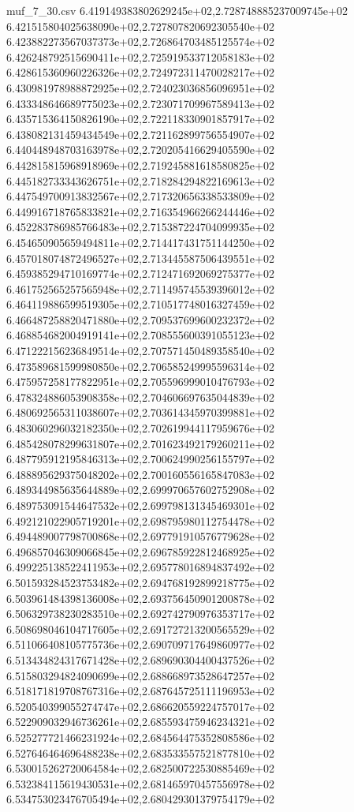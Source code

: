 \begin{filecontents*}{muf_7_30.csv}
6.419149383802629245e+02,2.728748885237009745e+02
6.421515804025638090e+02,2.727807820692305540e+02
6.423882273567037373e+02,2.726864703485125574e+02
6.426248792515690411e+02,2.725919533712058183e+02
6.428615360960226326e+02,2.724972311470028217e+02
6.430981978988872925e+02,2.724023036856096951e+02
6.433348646689775023e+02,2.723071709967589413e+02
6.435715364150826190e+02,2.722118330901857917e+02
6.438082131459434549e+02,2.721162899756554907e+02
6.440448948703163978e+02,2.720205416629405590e+02
6.442815815968918969e+02,2.719245881618580825e+02
6.445182733343626751e+02,2.718284294822169613e+02
6.447549700913832567e+02,2.717320656338533809e+02
6.449916718765833821e+02,2.716354966266244446e+02
6.452283786985766483e+02,2.715387224704099935e+02
6.454650905659494811e+02,2.714417431751144250e+02
6.457018074872496527e+02,2.713445587506439551e+02
6.459385294710169774e+02,2.712471692069275377e+02
6.461752565257565948e+02,2.711495745539396012e+02
6.464119886599519305e+02,2.710517748016327459e+02
6.466487258820471880e+02,2.709537699600232372e+02
6.468854682004919141e+02,2.708555600391055123e+02
6.471222156236849514e+02,2.707571450489358540e+02
6.473589681599980850e+02,2.706585249995596314e+02
6.475957258177822951e+02,2.705596999010476793e+02
6.478324886053908358e+02,2.704606697635044839e+02
6.480692565311038607e+02,2.703614345970399881e+02
6.483060296032182350e+02,2.702619944117959676e+02
6.485428078299631807e+02,2.701623492179260211e+02
6.487795912195846313e+02,2.700624990256155797e+02
6.488895629375048202e+02,2.700160556165847083e+02
6.489344985635644889e+02,2.699970657602752908e+02
6.489753091544647532e+02,2.699798131345469301e+02
6.492121022905719201e+02,2.698795980112754478e+02
6.494489007798700868e+02,2.697791910576779628e+02
6.496857046309066845e+02,2.696785922812468925e+02
6.499225138522411953e+02,2.695778016894837492e+02
6.501593284523753482e+02,2.694768192899218775e+02
6.503961484398136008e+02,2.693756450901200878e+02
6.506329738230283510e+02,2.692742790976353717e+02
6.508698046104717605e+02,2.691727213200565529e+02
6.511066408105775736e+02,2.690709717649860977e+02
6.513434824317671428e+02,2.689690304400437526e+02
6.515803294824090699e+02,2.688668973528647257e+02
6.518171819708767316e+02,2.687645725111196953e+02
6.520540399055274747e+02,2.686620559224757017e+02
6.522909032946736261e+02,2.685593475946234321e+02
6.525277721466231924e+02,2.684564475352808586e+02
6.527646464696488238e+02,2.683533557521877810e+02
6.530015262720064584e+02,2.682500722530885469e+02
6.532384115619430531e+02,2.681465970457556978e+02
6.534753023476705494e+02,2.680429301379754179e+02

\end{filecontents*}
